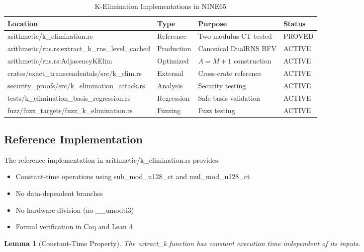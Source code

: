 \documentclass[11pt,letterpaper]{article}
\newtheorem{lemma}[theorem]{Lemma}
\begin{document}
\begin{table}[h]
\centering
\caption{K-Elimination Implementations in NINE65}
\label{tab:implementations}
\begin{tabular}{llll}
\toprule
Location & Type & Purpose & Status \\
\midrule
{\ttfamily arithmetic/k\_elimination.rs} & Reference & Two-modulus CT-tested & PROVED \\
{\ttfamily arithmetic/rns.rs:extract\_k\_rns\_level\_cached} & Production & Canonical DualRNS BFV & ACTIVE \\
{\ttfamily arithmetic/rns.rs:AdjacencyKElim} & Optimized & \(A = M+1\) construction & ACTIVE \\
{\ttfamily crates/exact\_transcendentals/src/k\_elim.rs} & External & Cross-crate reference & ACTIVE \\
{\ttfamily security\_proofs/src/k\_elimination\_attack.rs} & Analysis & Security testing & ACTIVE \\
{\ttfamily tests/k\_elimination\_basis\_regression.rs} & Regression & Safe-basis validation & ACTIVE \\
{\ttfamily fuzz/fuzz\_targets/fuzz\_k\_elimination.rs} & Fuzzing & Fuzz testing & ACTIVE \\
\bottomrule
\end{tabular}
\end{table}

\subsection{Reference Implementation}

The reference implementation in {\ttfamily arithmetic/k\_elimination.rs} provides:

\begin{itemize}
\item Constant-time operations using {\ttfamily sub\_mod\_u128\_ct} and {\ttfamily mul\_mod\_u128\_ct}
\item No data-dependent branches
\item No hardware division (no {\ttfamily \_\_umodti3})
\item Formal verification in Coq and Lean 4
\end{itemize}

\begin{lemma}[Constant-Time Property]
\label{lem:ct}
The {\ttfamily extract\_k} function has constant execution time independent of its inputs.
\end{lemma}
\end{document}
